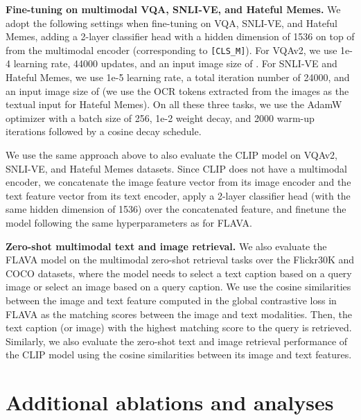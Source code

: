 \documentclass[10pt,twocolumn,letterpaper]{article}
\newcommand{\myparagraph}[1]{\vspace{0.25em}\noindent\textbf{#1}}
\begin{document}
\myparagraph{Fine-tuning on multimodal VQA, SNLI-VE, and Hateful Memes.} We adopt the following settings when fine-tuning on VQA, SNLI-VE, and Hateful Memes, adding a 2-layer classifier head with a hidden dimension of 1536 on top of  from the multimodal encoder (corresponding to \texttt{[CLS\_M]}). For VQAv2, we use 1e-4 learning rate, 44000 updates, and an input image size of . For SNLI-VE and Hateful Memes, we use 1e-5 learning rate, a total iteration number of 24000, and an input image size of  (we use the OCR tokens extracted from the images as the textual input for Hateful Memes). On all these three tasks, we use the AdamW optimizer with a batch size of 256, 1e-2 weight decay, and 2000 warm-up iterations followed by a cosine decay schedule.

We use the same approach above to also evaluate the CLIP model on VQAv2, SNLI-VE, and Hateful Memes datasets. Since CLIP does not have a multimodal encoder, we concatenate the image feature vector from its image encoder and the text feature vector from its text encoder, apply a 2-layer classifier head (with the same hidden dimension of 1536) over the concatenated feature, and finetune the model following the same hyperparameters as for FLAVA.

\myparagraph{Zero-shot multimodal text and image retrieval.} We also evaluate the FLAVA model on the multimodal zero-shot retrieval tasks over the Flickr30K and COCO datasets, where the model needs to select a text caption based on a query image or select an image based on a query caption. We use the cosine similarities between the image and text feature computed in the global contrastive loss in FLAVA as the matching scores between the image and text modalities. Then, the text caption (or image) with the highest matching score to the query is retrieved. Similarly, we also evaluate the zero-shot text and image retrieval performance of the CLIP model using the cosine similarities between its image and text features.

\section{Additional ablations and analyses}
\label{sec:supp_ablation}
\end{document}
